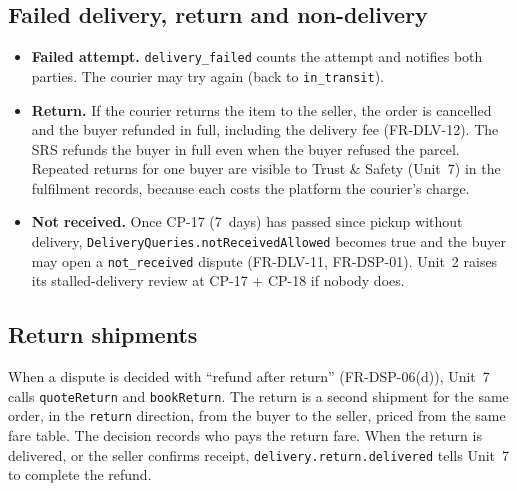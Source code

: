 \documentclass[11pt,a4paper]{article}
\begin{document}
\subsection{Failed delivery, return and non-delivery}
\begin{itemize}[nosep]
  \item \textbf{Failed attempt.} \texttt{delivery\_failed} counts the attempt and notifies both parties. The courier may try again (back to \texttt{in\_transit}).
  \item \textbf{Return.} If the courier returns the item to the seller, the order is cancelled and the buyer refunded in full, including the delivery fee (FR-DLV-12). The SRS refunds the buyer in full even when the buyer refused the parcel. Repeated returns for one buyer are visible to Trust \& Safety (Unit~7) in the fulfilment records, because each costs the platform the courier's charge.
  \item \textbf{Not received.} Once CP-17 (7~days) has passed since pickup without delivery, \texttt{DeliveryQueries.notReceivedAllowed} becomes true and the buyer may open a \texttt{not\_received} dispute (FR-DLV-11, FR-DSP-01). Unit~2 raises its stalled-delivery review at CP-17 $+$ CP-18 if nobody does.
\end{itemize}

\subsection{Return shipments}
When a dispute is decided with ``refund after return'' (FR-DSP-06(d)), Unit~7 calls \texttt{quoteReturn} and \texttt{bookReturn}. The return is a second shipment for the same order, in the \texttt{return} direction, from the buyer to the seller, priced from the same fare table. The decision records who pays the return fare. When the return is delivered, or the seller confirms receipt, \texttt{delivery.return.delivered} tells Unit~7 to complete the refund.
\end{document}
